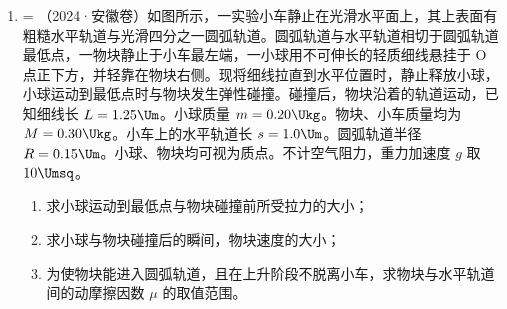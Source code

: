 \documentclass[\gkver]{gaokaozhenti}
\makeatletter
\newcommand{\tiinfo}[2]{{\small\color{gray}（#1）\textcolor{orange!85!black}{\nandu{#2}}}\hspace{0.4em}}
\newenvironment{tibody}
  {\begin{minipage}[t]{\linewidth}\@listdepth=\@ne\leavevmode\ignorespaces}
  {\end{minipage}}
\makeatother
\begin{document}
\begin{enumerate}[resume=tiku]
\begin{tibody}
\end{tibody}


\item
\begin{tibody}
\tiinfo{2024·安徽卷}{3}如图所示，一实验小车静止在光滑水平面上，其上表面有粗糙水平轨道与光滑四分之一圆弧轨道。圆弧轨道与水平轨道相切于圆弧轨道最低点，一物块静止于小车最左端，一小球用不可伸长的轻质细线悬挂于 O 点正下方，并轻靠在物块右侧。现将细线拉直到水平位置时，静止释放小球，小球运动到最低点时与物块发生弹性碰撞。碰撞后，物块沿着的轨道运动，已知细线长 $L = 1.25 \Um$。小球质量 $m = 0.20 \Ukg$。物块、小车质量均为 $M = 0.30 \Ukg$。小车上的水平轨道长 $s = 1.0 \Um$。圆弧轨道半径 $R = 0.15 \Um$。小球、物块均可视为质点。不计空气阻力，重力加速度 $g$ 取 $10 \Umsq$。
\begin{enumerate}
	\item
	求小球运动到最低点与物块碰撞前所受拉力的大小；
	\item
	求小球与物块碰撞后的瞬间，物块速度的大小；
	\item
	为使物块能进入圆弧轨道，且在上升阶段不脱离小车，求物块与水平轨道间的动摩擦因数 $\mu$ 的取值范围。
\end{enumerate}
\end{tibody}


\end{enumerate}
\end{document}
